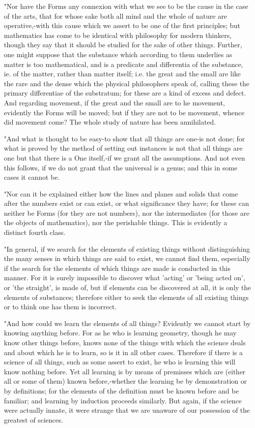 "Nor have the Forms any connexion with what we see to be the cause
in the case of the arts, that for whose sake both all mind and the
whole of nature are operative,-with this cause which we assert to
be one of the first principles; but mathematics has come to be identical
with philosophy for modern thinkers, though they say that it should
be studied for the sake of other things. Further, one might suppose
that the substance which according to them underlies as matter is
too mathematical, and is a predicate and differentia of the substance,
ie. of the matter, rather than matter itself; i.e. the great and the
small are like the rare and the dense which the physical philosophers
speak of, calling these the primary differentiae of the substratum;
for these are a kind of excess and defect. And regarding movement,
if the great and the small are to he movement, evidently the Forms
will be moved; but if they are not to be movement, whence did movement
come? The whole study of nature has been annihilated. 

"And what is thought to be easy-to show that all things are one-is
not done; for what is proved by the method of setting out instances
is not that all things are one but that there is a One itself,-if
we grant all the assumptions. And not even this follows, if we do
not grant that the universal is a genus; and this in some cases it
cannot be. 

"Nor can it be explained either how the lines and planes and solids
that come after the numbers exist or can exist, or what significance
they have; for these can neither be Forms (for they are not numbers),
nor the intermediates (for those are the objects of mathematics),
nor the perishable things. This is evidently a distinct fourth class.

"In general, if we search for the elements of existing things without
distinguishing the many senses in which things are said to exist,
we cannot find them, especially if the search for the elements of
which things are made is conducted in this manner. For it is surely
impossible to discover what 'acting' or 'being acted on', or 'the
straight', is made of, but if elements can be discovered at all, it
is only the elements of substances; therefore either to seek the elements
of all existing things or to think one has them is incorrect.

"And how could we learn the elements of all things? Evidently we cannot
start by knowing anything before. For as he who is learning geometry,
though he may know other things before, knows none of the things with
which the science deals and about which he is to learn, so is it in
all other cases. Therefore if there is a science of all things, such
as some assert to exist, he who is learning this will know nothing
before. Yet all learning is by means of premisses which are (either
all or some of them) known before,-whether the learning be by demonstration
or by definitions; for the elements of the definition must be known
before and be familiar; and learning by induction proceeds similarly.
But again, if the science were actually innate, it were strange that
we are unaware of our possession of the greatest of sciences.

